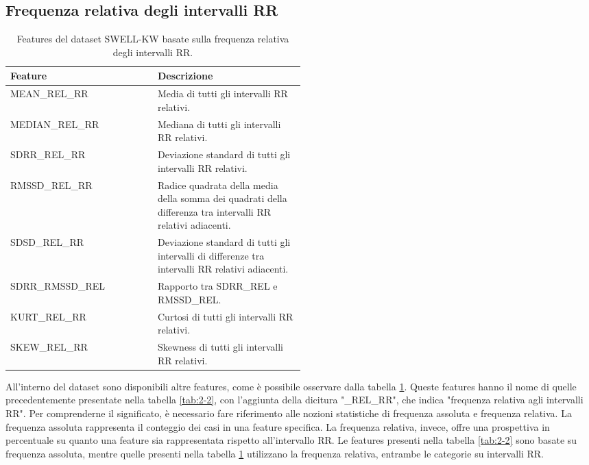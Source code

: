 \subsection{Frequenza relativa degli intervalli RR}

\begin{table}[t]
    \centering
    \begin{tabular}{|lp{0.5\linewidth}|}
        \hline
        \textbf{Feature}
        & \textbf{Descrizione} \\
        \hline
        MEAN\_REL\_RR
        & Media di tutti gli intervalli RR relativi. \\
        MEDIAN\_REL\_RR
        & Mediana di tutti gli intervalli RR relativi. \\
        SDRR\_REL\_RR
        & Deviazione standard di tutti gli intervalli RR relativi. \\
        RMSSD\_REL\_RR
        & Radice quadrata della media della somma dei quadrati della differenza tra intervalli RR relativi adiacenti. \\
        SDSD\_REL\_RR
        & Deviazione standard di tutti gli intervalli di differenze tra intervalli RR relativi adiacenti. \\
        SDRR\_RMSSD\_REL
        & Rapporto tra SDRR\_REL e RMSSD\_REL. \\
        KURT\_REL\_RR
        & Curtosi di tutti gli intervalli RR relativi. \\
        SKEW\_REL\_RR
        & Skewness di tutti gli intervalli RR relativi. \\
        \hline
    \end{tabular}
    \caption{Features del dataset SWELL-KW basate sulla frequenza relativa degli intervalli RR.}
    \label{tab:2-3}
\end{table}

All'interno del dataset sono disponibili altre features, come è possibile osservare dalla tabella \ref{tab:2-3}. Queste features hanno il nome di quelle precedentemente presentate nella tabella \ref{tab:2-2}, con l'aggiunta della dicitura "\_REL\_RR", che indica "frequenza relativa agli intervalli RR". Per comprenderne il significato, è necessario fare riferimento alle nozioni statistiche di frequenza assoluta e frequenza relativa. La frequenza assoluta rappresenta il conteggio dei casi in una feature specifica. La frequenza relativa, invece, offre una prospettiva in percentuale su quanto una feature sia rappresentata rispetto all'intervallo RR. Le features presenti nella tabella \ref{tab:2-2} sono basate su frequenza assoluta, mentre quelle presenti nella tabella \ref{tab:2-3} utilizzano la frequenza relativa, entrambe le categorie su intervalli RR.

